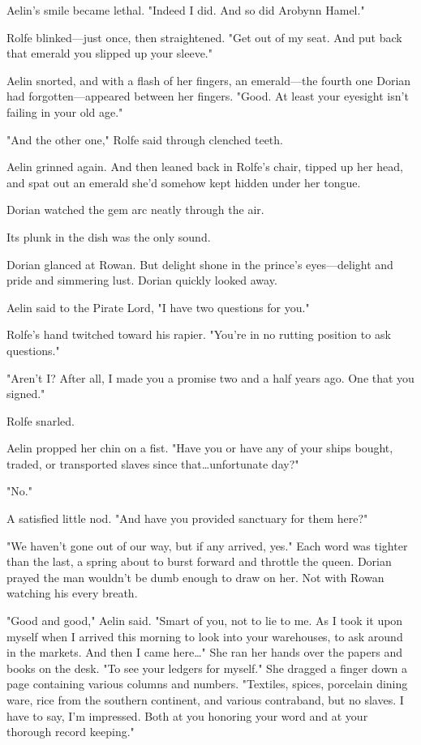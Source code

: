 Aelin's smile became lethal.
"Indeed I did.
And so did Arobynn Hamel."

Rolfe blinked---just once, then straightened.
"Get out of my seat.
And put back that emerald you slipped up your sleeve."

Aelin snorted, and with a flash of her fingers, an emerald---the fourth one Dorian had forgotten---appeared between her fingers.
"Good.
At least your eyesight isn't failing in your old age."

"And the other one," Rolfe said through clenched teeth.

Aelin grinned again.
And then leaned back in Rolfe's chair, tipped up her head, and spat out an emerald she'd somehow kept hidden under her tongue.

Dorian watched the gem arc neatly through the air.

Its plunk in the dish was the only sound.

Dorian glanced at Rowan.
But delight shone in the prince's eyes---delight and pride and simmering lust.
Dorian quickly looked away.

Aelin said to the Pirate Lord, "I have two questions for you."

Rolfe's hand twitched toward his rapier.
"You're in no rutting position to ask questions."

"Aren't I?
After all, I made you a promise two and a half years ago.
One that you signed."

Rolfe snarled.

Aelin propped her chin on a fist.
"Have you or have any of your ships bought, traded, or transported slaves since that\ldots unfortunate day?"

"No."

A satisfied little nod.
"And have you provided sanctuary for them here?"

"We haven't gone out of our way, but if any arrived, yes."
Each word was tighter than the last, a spring about to burst forward and throttle the queen.
Dorian prayed the man wouldn't be dumb enough to draw on her.
Not with Rowan watching his every breath.

"Good and good," Aelin said.
"Smart of you, not to lie to me.
As I took it upon myself when I arrived this morning to look into your warehouses, to ask around in the markets.
And then I came here\ldots" She ran her hands over the papers and books on the desk.
"To see your ledgers for myself."
She dragged a finger down a page containing various columns and numbers.
"Textiles, spices, porcelain dining ware, rice from the southern continent, and various contraband, but 
no slaves.
I have to say, I'm impressed.
Both at you honoring your word and at your thorough record keeping."

